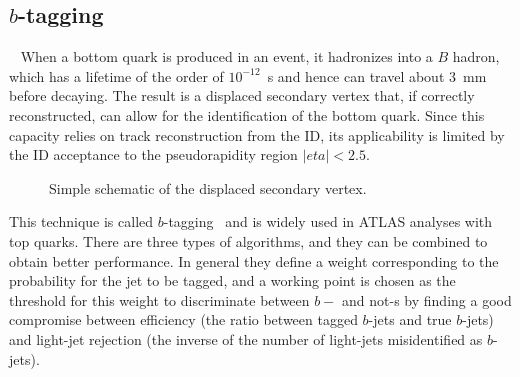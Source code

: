 
\myskip
\tocless\subsection{$b$-tagging}~\label{sec:btagging}
When a bottom quark is produced in an event, it hadronizes into a $B$ hadron, which has
a lifetime of the order of $10^{-12}$~s and hence can travel about 3~mm before decaying.
The result is a displaced secondary vertex that, if correctly reconstructed, can
allow for the identification of the bottom quark. 
Since this capacity relies on track reconstruction from the ID, its applicability
is limited by the ID acceptance to the pseudorapidity region $|eta|<2.5$.

\begin{figure}[tb]\begin{center}
	\caption{Simple schematic of the displaced secondary vertex.\label{fig:btagvtx}}
\end{center}\end{figure}

This technique is called $b$-tagging~\cite{ref:ATLAS-CONF-2011-102} and is
widely used in ATLAS analyses with top quarks. There are three types of algorithms,
and they can be combined to obtain better performance. In general they define a weight
corresponding to the probability for the jet to be tagged, and a working point is chosen
as the threshold for this weight to discriminate between $b-$ and not-\bjet s
by finding a good compromise between efficiency (the ratio between tagged
$b$-jets and true $b$-jets) and light-jet rejection
(the inverse of the number of light-jets misidentified as $b$-jets).

